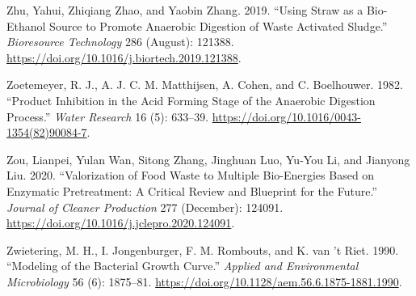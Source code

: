 \documentclass[11pt]{report}
\begin{document}
\begin{hangparas}{1.5em}{1}
\hypertarget{citeproc_bib_item_97}{Zhu, Yahui, Zhiqiang Zhao, and Yaobin Zhang. 2019. “Using Straw as a Bio-Ethanol Source to Promote Anaerobic Digestion of Waste Activated Sludge.” \textit{Bioresource Technology} 286 (August): 121388. \url{https://doi.org/10.1016/j.biortech.2019.121388}.}

\hypertarget{citeproc_bib_item_98}{Zoetemeyer, R. J., A. J. C. M. Matthijsen, A. Cohen, and C. Boelhouwer. 1982. “Product Inhibition in the Acid Forming Stage of the Anaerobic Digestion Process.” \textit{Water Research} 16 (5): 633–39. \url{https://doi.org/10.1016/0043-1354(82)90084-7}.}

\hypertarget{citeproc_bib_item_99}{Zou, Lianpei, Yulan Wan, Sitong Zhang, Jinghuan Luo, Yu-You Li, and Jianyong Liu. 2020. “Valorization of Food Waste to Multiple Bio-Energies Based on Enzymatic Pretreatment: A Critical Review and Blueprint for the Future.” \textit{Journal of Cleaner Production} 277 (December): 124091. \url{https://doi.org/10.1016/j.jclepro.2020.124091}.}

\hypertarget{citeproc_bib_item_100}{Zwietering, M. H., I. Jongenburger, F. M. Rombouts, and K. van ’t Riet. 1990. “Modeling of the Bacterial Growth Curve.” \textit{Applied and Environmental Microbiology} 56 (6): 1875–81. \url{https://doi.org/10.1128/aem.56.6.1875-1881.1990}.}\bigskip
\end{hangparas}
\end{document}

